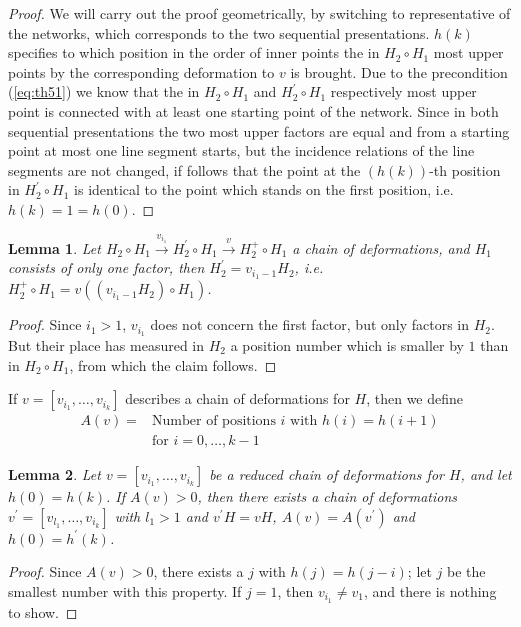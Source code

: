 \documentclass{article}
\newtheorem{lemma}{Lemma}
\begin{document}
\begin{proof}
We will carry out the proof geometrically, by switching to representative of the networks, which corresponds to the two sequential presentations.
$h(k)$ specifies to which position in the order of inner points the in $H_2 \circ H_1$ most upper points by the corresponding deformation to $v$ is brought.
Due to the precondition (\ref{eq:th51}) we know that the in $H_2 \circ H_1$ and $H^{\prime}_2 \circ H_1$ respectively most upper point 
is connected with at least one starting point of the network.
Since in both sequential presentations the two most upper factors are equal and from a starting point at most one line segment starts, 
but the incidence relations of the line segments are not changed, 
if follows that the point at the $(h(k))$-th position in $H^{\prime}_2 \circ H_1$ is identical to the point which stands on the first position, i.e. $h(k) = 1 = h(0)$.
\end{proof}

\begin{lemma}
Let $H_2 \circ H_1 \xrightarrow{v_{i_1}} H_2^{\prime} \circ H_1 \xrightarrow{v} H^{+}_2 \circ H_1$ a chain of deformations,
and $H_1$ consists of only one factor, then $H^{\prime}_2=v_{i_1 - 1} H_2$, i.e. $H^{+}_2 \circ H_1 = v ((v_{i_1-1} H_2) \circ H_1)$.  
\end{lemma}

\begin{proof}
Since $i_1 > 1$, $v_{i_1}$ does not concern the first factor, but only factors in $H_2$. 
But their place has measured in $H_2$ a position number which is smaller by $1$ than in $H_2 \circ H_1$, from which the claim follows.
\end{proof}

If $v=[v_{i_1}, \ldots, v_{i_k}]$ describes a chain of deformations for $H$, then we define
\[
\begin{array}{rc} 
   A(v) = & \mbox{Number of positions $i$ with $h(i) = h(i + 1)$} \\
          & \mbox{for $i = 0 , \ldots, k - 1$}
\end{array}
\]

\begin{lemma}
Let $v = [v_{i_1} , \ldots, v_{i_k}]$ be a reduced chain of deformations for $H$, 
and let $h(0) = h(k)$. If $A(v) > 0$, then there exists a chain of deformations $v^{\prime}= [ v_{l_1}, \ldots, v_{i_k}]$ with $l_1 > 1$ and $v^{\prime} H = v H$, 
$A(v) = A(v^{\prime})$ and $h(0)=h^{\prime}(k)$.
\end{lemma}
\begin{proof}
Since $A(v) > 0$, there exists a $j$ with $h(j) = h(j - i)$;
let $j$ be the smallest number with this property. If $j = 1$, then $v_{i_1} \neq v_1$, and there is nothing to show.
\end{proof}
\end{document}
